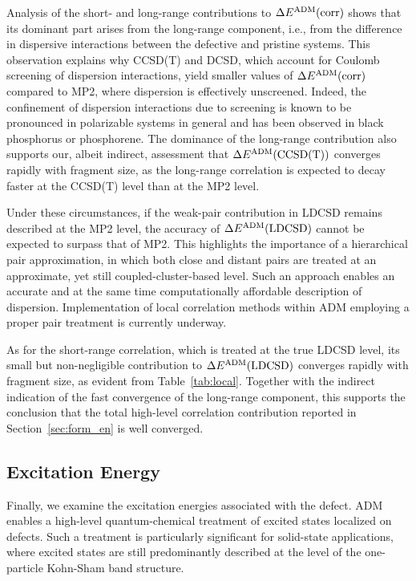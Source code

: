 \documentclass[aip,jcp,reprint]{revtex4-2}
\begin{document}
Analysis of the short- and long-range contributions to $\Delta E^{\rm ADM}({\rm corr})$ shows that its dominant part arises from the long-range component, i.e., from the difference in dispersive interactions between the defective and pristine systems. This observation explains why CCSD(T) and DCSD, which account for Coulomb screening of dispersion interactions, yield smaller values of $\Delta E^{\rm ADM}({\rm corr})$ compared to MP2, where dispersion is effectively unscreened. Indeed, the confinement of dispersion interactions due to screening is  known to be pronounced in polarizable systems in general and has been observed in black phosphorus or phosphorene.\cite{schuetz_usvyat_black_p}  
The dominance of the long-range contribution also supports our, albeit indirect, assessment that $\Delta E^{\rm ADM}({\rm CCSD(T)})$ converges rapidly with fragment size, as the long-range correlation is expected to decay faster at the CCSD(T) level than at the MP2 level.

Under these circumstances, if the weak-pair contribution in LDCSD remains described at the MP2 level, the accuracy of $\Delta E^{\rm ADM}({\rm LDCSD})$ cannot be expected to surpass that of MP2. This highlights the importance of a hierarchical pair approximation,\cite{Weak_pairs_schuetz_usvyat,weak_pair_werner_usvyat} in which both close and distant pairs are treated at an approximate, yet still coupled-cluster-based level. Such an approach enables an accurate and at the same time computationally affordable description of dispersion. Implementation of local correlation methods within ADM employing a proper pair treatment is currently underway.


As for the short-range correlation, which is treated at the true LDCSD level, its small but non-negligible contribution to $\Delta E^{\rm ADM}({\rm LDCSD})$ converges rapidly with fragment size, as evident from Table~\ref{tab:local}. Together with the indirect indication of the fast convergence of the long-range component, this supports the conclusion that the total high-level correlation contribution reported in Section~\ref{sec:form_en} is well converged.




\subsection{Excitation Energy}


Finally, we examine the excitation energies associated with the defect.
ADM enables a high-level quantum-chemical treatment of excited states localized on defects. Such a treatment is particularly significant for solid-state applications, where excited states are still predominantly described at the level of the one-particle Kohn-Sham band structure.
\end{document}
